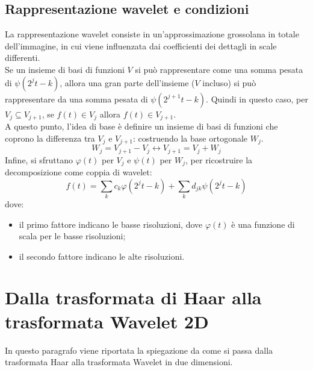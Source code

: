 \subsection{Rappresentazione wavelet e condizioni}
La rappresentazione wavelet consiste in un'approssimazione grossolana in totale dell'immagine, in cui viene influenzata dai coefficienti dei dettagli in scale differenti.\\
Se un insieme di basi di funzioni $V$ si può rappresentare come una somma pesata di $\psi(2^jt-k)$, allora una gran parte dell'insieme ($V$ incluso) si può rappresentare da una somma pesata di $\psi(2^{j+1}t-k)$. Quindi
in questo caso, per $V_j \subseteq V_{j+1}$, se $f(t) \in V_j$ allora $f(t) \in V_{j+1}$.\\
A questo punto, l'idea di base è definire un insieme di basi di funzioni che coprono la differenza tra $V_j$ e $V_{j+1}$: costruendo la base ortogonale $W_j$.
\begin{equation*}
   W_j=V_{j+1}-V_j \leftrightarrow V_{j+1}=V_j+W_j
\end{equation*}
Infine, si sfruttano $\varphi(t)$ per $V_j$ e $\psi(t)$ per $W_j$, per ricostruire la decomposizione come coppia di wavelet:
\begin{equation*}
    f(t)=\sum_{k}c_k\varphi\left(2^jt-k\right)+\sum_{k}d_{jk}\psi\left(2^jt-k\right)
\end{equation*}
dove:
\begin{itemize}
    \item il primo fattore indicano le basse risoluzioni, dove $\varphi(t)$ è una funzione di scala per le basse risoluzioni;
    \item il secondo fattore indicano le alte risoluzioni.
\end{itemize}
\section{Dalla trasformata di Haar alla trasformata Wavelet 2D}
In questo paragrafo viene riportata la spiegazione da come si passa dalla trasformata Haar alla trasformata Wavelet in due dimensioni.
